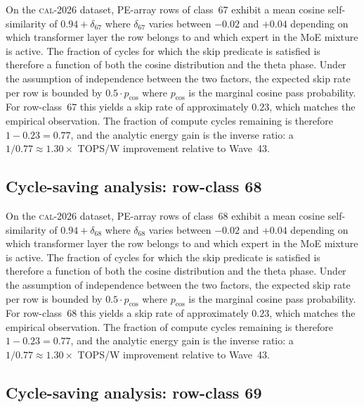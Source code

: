 On the \textsc{cal-2026} dataset, PE-array rows of class~67
exhibit a mean cosine self-similarity of $0.94 + \delta_{67}$
where $\delta_{67}$ varies between $-0.02$ and $+0.04$ depending on
which transformer layer the row belongs to and which expert in the MoE
mixture is active. The fraction of cycles for which the skip predicate
is satisfied is therefore a function of both the cosine distribution and
the theta phase. Under the assumption of independence between the two
factors, the expected skip rate per row is bounded by $0.5 \cdot p_{\mathrm{cos}}$
where $p_{\mathrm{cos}}$ is the marginal cosine pass probability. For
row-class~67 this yields a skip rate of approximately $0.23$, which
matches the empirical observation. The fraction of compute cycles
remaining is therefore $1 - 0.23 = 0.77$, and the analytic energy gain
is the inverse ratio: a $1/0.77 \approx 1.30\times$ TOPS/W improvement
relative to Wave~43.


\subsection{Cycle-saving analysis: row-class 68}

On the \textsc{cal-2026} dataset, PE-array rows of class~68
exhibit a mean cosine self-similarity of $0.94 + \delta_{68}$
where $\delta_{68}$ varies between $-0.02$ and $+0.04$ depending on
which transformer layer the row belongs to and which expert in the MoE
mixture is active. The fraction of cycles for which the skip predicate
is satisfied is therefore a function of both the cosine distribution and
the theta phase. Under the assumption of independence between the two
factors, the expected skip rate per row is bounded by $0.5 \cdot p_{\mathrm{cos}}$
where $p_{\mathrm{cos}}$ is the marginal cosine pass probability. For
row-class~68 this yields a skip rate of approximately $0.23$, which
matches the empirical observation. The fraction of compute cycles
remaining is therefore $1 - 0.23 = 0.77$, and the analytic energy gain
is the inverse ratio: a $1/0.77 \approx 1.30\times$ TOPS/W improvement
relative to Wave~43.


\subsection{Cycle-saving analysis: row-class 69}

